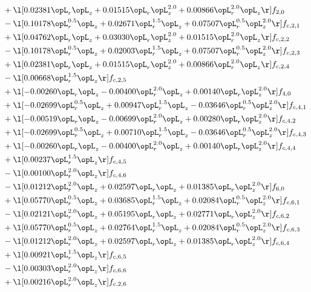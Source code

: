 \begin{alignat}{2}
& + \l[  0.02381 \opL_r \opL_z +  0.01515 \opL_r \opL_z^{2.0} +  0.00866 \opL_r^{2.0} \opL_z  \r] f_{2,0} \nonumber \\ 
& - \l[  0.10178 \opL_r^{0.5} \opL_z +  0.02671 \opL_r^{1.5} \opL_z +  0.07507 \opL_r^{0.5} \opL_z^{2.0}  \r] f_{c,2,1} \nonumber \\ 
& + \l[  0.04762 \opL_r \opL_z +  0.03030 \opL_r \opL_z^{2.0} +  0.01515 \opL_r^{2.0} \opL_z  \r] f_{c,2,2} \nonumber \\ 
& - \l[  0.10178 \opL_r^{0.5} \opL_z +  0.02003 \opL_r^{1.5} \opL_z +  0.07507 \opL_r^{0.5} \opL_z^{2.0}  \r] f_{c,2,3} \nonumber \\ 
& + \l[  0.02381 \opL_r \opL_z +  0.01515 \opL_r \opL_z^{2.0} +  0.00866 \opL_r^{2.0} \opL_z  \r] f_{c,2,4} \nonumber \\ 
& - \l[  0.00668 \opL_r^{1.5} \opL_z  \r] f_{c,2,5} \nonumber \\ 
& + \l[  -0.00260 \opL_r \opL_z   -0.00400 \opL_r^{2.0} \opL_z +  0.00140 \opL_r \opL_z^{2.0}  \r] f_{4,0} \nonumber \\ 
& + \l[  -0.02699 \opL_r^{0.5} \opL_z +  0.00947 \opL_r^{1.5} \opL_z   -0.03646 \opL_r^{0.5} \opL_z^{2.0}  \r] f_{c,4,1} \nonumber \\ 
& + \l[  -0.00519 \opL_r \opL_z   -0.00699 \opL_r^{2.0} \opL_z +  0.00280 \opL_r \opL_z^{2.0}  \r] f_{c,4,2} \nonumber \\ 
& + \l[  -0.02699 \opL_r^{0.5} \opL_z +  0.00710 \opL_r^{1.5} \opL_z   -0.03646 \opL_r^{0.5} \opL_z^{2.0}  \r] f_{c,4,3} \nonumber \\ 
& + \l[  -0.00260 \opL_r \opL_z   -0.00400 \opL_r^{2.0} \opL_z +  0.00140 \opL_r \opL_z^{2.0}  \r] f_{c,4,4} \nonumber \\ 
& + \l[  0.00237 \opL_r^{1.5} \opL_z  \r] f_{c,4,5} \nonumber \\ 
& - \l[  0.00100 \opL_r^{2.0} \opL_z  \r] f_{c,4,6} \nonumber \\ 
& - \l[  0.01212 \opL_r^{2.0} \opL_z +  0.02597 \opL_r \opL_z +  0.01385 \opL_r \opL_z^{2.0}  \r] f_{6,0} \nonumber \\ 
& + \l[  0.05770 \opL_r^{0.5} \opL_z +  0.03685 \opL_r^{1.5} \opL_z +  0.02084 \opL_r^{0.5} \opL_z^{2.0}  \r] f_{c,6,1} \nonumber \\ 
& - \l[  0.02121 \opL_r^{2.0} \opL_z +  0.05195 \opL_r \opL_z +  0.02771 \opL_r \opL_z^{2.0}  \r] f_{c,6,2} \nonumber \\ 
& + \l[  0.05770 \opL_r^{0.5} \opL_z +  0.02764 \opL_r^{1.5} \opL_z +  0.02084 \opL_r^{0.5} \opL_z^{2.0}  \r] f_{c,6,3} \nonumber \\ 
& - \l[  0.01212 \opL_r^{2.0} \opL_z +  0.02597 \opL_r \opL_z +  0.01385 \opL_r \opL_z^{2.0}  \r] f_{c,6,4} \nonumber \\ 
& + \l[  0.00921 \opL_r^{1.5} \opL_z  \r] f_{c,6,5} \nonumber \\ 
& - \l[  0.00303 \opL_r^{2.0} \opL_z  \r] f_{c,6,6} \nonumber \\ 
& + \l[  0.00216 \opL_r^{2.0} \opL_z  \r] f_{c,2,6} \nonumber \\ 
\end{alignat} 


